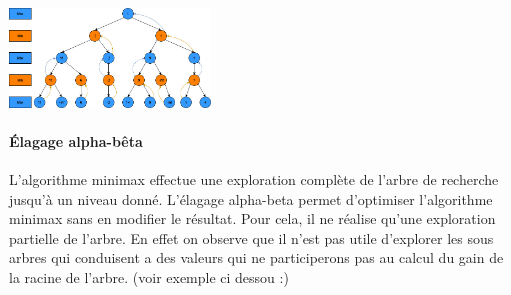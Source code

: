\includegraphics[width=0.4\textwidth]{root/MinMax.jpeg}

\paragraph{Élagage alpha-bêta}
L'algorithme minimax effectue une exploration complète de l'arbre de recherche jusqu'à un niveau donné. L'élagage alpha-beta permet d'optimiser 
l'algorithme minimax sans en modifier le résultat. Pour cela, il ne réalise qu'une exploration
partielle de l'arbre. En effet on observe que il n'est pas utile d'explorer les sous arbres qui conduisent a des valeurs
qui ne participerons pas au calcul du gain de la racine de l'arbre. (voir exemple ci dessou :)


